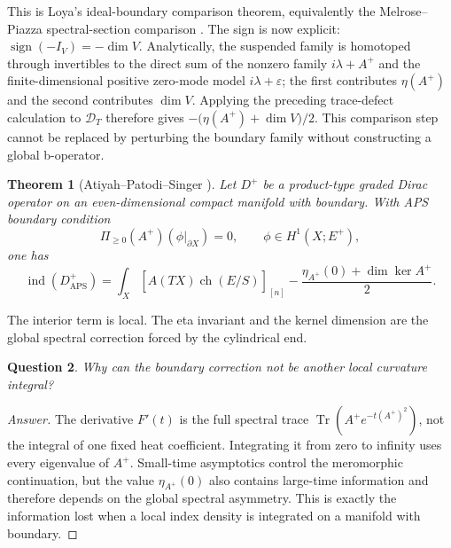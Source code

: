 \documentclass[12pt,oneside,reqno]{article}
\DeclareMathOperator{\Tr}{Tr}
\theoremstyle{plain}
\newtheorem{theorem}{Theorem}[section]
\newtheorem{question}[theorem]{Question}
\theoremstyle{definition}
\theoremstyle{remark}
\newenvironment{answer}{\begin{proof}[Answer]}{\end{proof}}
\begin{document}
This is Loya's ideal-boundary comparison theorem, equivalently the
Melrose--Piazza spectral-section comparison \cite{Loya,MelrosePiazza}.
The sign is now explicit:
\(\operatorname{sign}(-I_V)=-\dim V\).  Analytically, the suspended family
is homotoped through invertibles to the direct sum of the nonzero family
\(i\lambda+A^+\) and the finite-dimensional positive zero-mode model
\(i\lambda+\varepsilon\); the first contributes \(\eta(A^+)\) and the
second contributes \(\dim V\).  Applying the preceding trace-defect
calculation to \(\mathcal D_T\) therefore gives
\(-\bigl(\eta(A^+)+\dim V\bigr)/2\). This comparison step cannot be
replaced by perturbing the boundary family without constructing a global
b-operator.

\begin{theorem}[Atiyah--Patodi--Singer \cite{APS}]
Let \(D^+\) be a product-type graded Dirac operator on an
even-dimensional compact manifold with boundary. With APS boundary
condition
\[
 \Pi_{\geq0}(A^+)(\phi|_{\partial X})=0,
 \qquad \phi\in H^1(X;E^+),
\]
one has
\[
 \boxed{
 \operatorname{ind}(D^+_{\mathrm{APS}})
 =
 \int_X
 \left[
 \widehat A(TX)\operatorname{ch}(E/S)
 \right]_{[n]}
 -
 \frac{\eta_{A^+}(0)+\dim\ker A^+}{2}.
 }
\]
\end{theorem}

The interior term is local. The eta invariant and the kernel dimension are
the global spectral correction forced by the cylindrical end.

\begin{question}
Why can the boundary correction not be another local curvature integral?
\end{question}

\begin{answer}
The derivative \(F'(t)\) is the full spectral trace
\(\Tr(A^+e^{-t(A^+)^2})\), not the integral of one fixed heat coefficient.
Integrating it from zero to infinity uses every eigenvalue of \(A^+\).
Small-time asymptotics control the meromorphic continuation, but the value
\(\eta_{A^+}(0)\) also contains large-time information and therefore depends on
the global spectral asymmetry. This is exactly the information lost when a
local index density is integrated on a manifold with boundary.
\end{answer}
\end{document}
